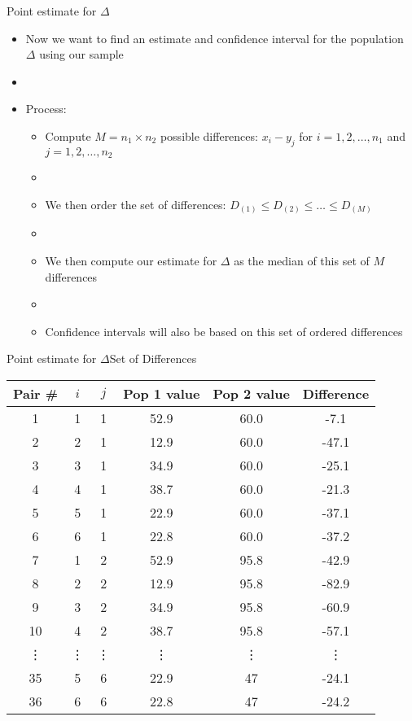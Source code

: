 \documentclass[xcolor=dvipsnames]{beamer}
\begin{document}
\begin{frame}{Point estimate for $\Delta$}
	\begin{itemize}
		\item Now we want to find an estimate and confidence interval for the population $\Delta$ using our sample \pause
		\item[]
		\item Process:
		\begin{itemize}
			\item Compute $M = n_1 \times n_2$ possible differences: $x_i - y_j$ for $i = 1, 2, \hdots, n_1$ and $j = 1, 2, \hdots, n_2$ \pause
			\item[]
			\item We then order the set of differences: $D_{(1)} \leq D_{(2)} \leq \hdots \leq D_{(M)}$ \pause
			\item[]
			\item We then compute our estimate for $\Delta$ as the median of this set of $M$ differences \pause
			\item[]
			\item Confidence intervals will also be based on this set of ordered differences
 		\end{itemize}
	\end{itemize}
\end{frame}

\begin{frame}{Point estimate for $\Delta$}{Set of Differences}
	\begin{center}
		\begin{tabular}{|c|c|c|c|c|c|}
			\hline
	\textbf{Pair \#} & $i$ & $j$ & \textbf{Pop 1 value} & \textbf{Pop 2 value} & \textbf{Difference} \\ \hline \hline
			1 &    1  &  1 &   52.9  &  60.0  &  -7.1\\ \hline
			2 &   2  &  1  &  12.9  &  60.0  & -47.1\\ \hline
			3  &  3  &  1  &  34.9 &   60.0  & -25.1\\ \hline
			4 &   4  &  1  &  38.7  &  60.0  & -21.3\\ \hline
			5 &   5  &  1  &  22.9  &  60.0  & -37.1\\ \hline
			6 &   6  &  1  &  22.8  &  60.0  & -37.2\\ \hline
			7 &   1  &  2  &  52.9  &  95.8  & -42.9\\ \hline
			8 &   2  &  2  &  12.9  &  95.8  & -82.9\\ \hline
			9 &   3  &  2  &  34.9  &  95.8  & -60.9\\ \hline
			10 &  4  &  2  &  38.7  &  95.8  & -57.1\\ \hline
			\vdots &\vdots &\vdots &\vdots & \vdots & \vdots \\ \hline
			35  &    5   &   6   &   22.9   &     47  &   -24.1 \\ \hline
			36   &   6   &   6   &   22.8   &     47   &  -24.2 \\ \hline
		\end{tabular}
	\end{center}
\end{frame}
\end{document}
